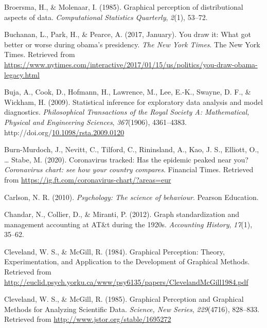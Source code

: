 \documentclass[print]{nuthesis}
\newlength{\cslhangindent}
\newenvironment{CSLReferences}%
{\setlength{\parindent}{0pt}%
\everypar{\setlength{\hangindent}{\cslhangindent}}\ignorespaces}%
{\par}
\begin{document}
\begin{CSLReferences}{1}{0}
\leavevmode\hypertarget{ref-broersma1985graphical}{}%
Broersma, H., \& Molenaar, I. (1985). Graphical perception of distributional aspects of data. \emph{Computational Statistics Quarterly}, \emph{2}(1), 53--72.

\leavevmode\hypertarget{ref-buchanan_park_pearce_2017}{}%
Buchanan, L., Park, H., \& Pearce, A. (2017, January). You draw it: What got better or worse during obama's presidency. \emph{The New York Times}. The New York Times. Retrieved from \url{https://www.nytimes.com/interactive/2017/01/15/us/politics/you-draw-obama-legacy.html}

\leavevmode\hypertarget{ref-buja_statistical_2009}{}%
Buja, A., Cook, D., Hofmann, H., Lawrence, M., Lee, E.-K., Swayne, D. F., \& Wickham, H. (2009). Statistical inference for exploratory data analysis and model diagnostics. \emph{Philosophical Transactions of the Royal Society A: Mathematical, Physical and Engineering Sciences}, \emph{367}(1906), 4361--4383. http://doi.org/\href{https://doi.org/10.1098/rsta.2009.0120}{10.1098/rsta.2009.0120}

\leavevmode\hypertarget{ref-burnmurdoch_2020}{}%
Burn-Murdoch, J., Nevitt, C., Tilford, C., Rininsland, A., Kao, J. S., Elliott, O., \ldots{} Stabe, M. (2020). Coronavirus tracked: Has the epidemic peaked near you? \emph{Coronavirus chart: see how your country compares}. Financial Times. Retrieved from \url{https://ig.ft.com/coronavirus-chart/?areas=eur}

\leavevmode\hypertarget{ref-carlson2010psychology}{}%
Carlson, N. R. (2010). \emph{Psychology: The science of behaviour}. Pearson Education.

\leavevmode\hypertarget{ref-chandar2012graph}{}%
Chandar, N., Collier, D., \& Miranti, P. (2012). Graph standardization and management accounting at AT\&t during the 1920s. \emph{Accounting History}, \emph{17}(1), 35--62.

\leavevmode\hypertarget{ref-cleveland_graphical_1984}{}%
Cleveland, W. S., \& McGill, R. (1984). Graphical {Perception}: {Theory}, {Experimentation}, and {Application} to the {Development} of {Graphical} {Methods}. Retrieved from \url{http://euclid.psych.yorku.ca/www/psy6135/papers/ClevelandMcGill1984.pdf}

\leavevmode\hypertarget{ref-cleveland_graphical_1985}{}%
Cleveland, W. S., \& McGill, R. (1985). Graphical {Perception} and {Graphical} {Methods} for {Analyzing} {Scientific} {Data}. \emph{Science, New Series}, \emph{229}(4716), 828--833. Retrieved from \url{http://www.jstor.org/stable/1695272}


\end{CSLReferences}
\end{document}
